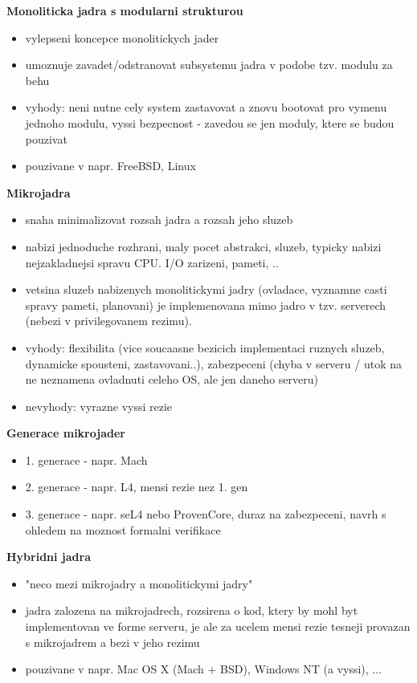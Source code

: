 \documentclass[a4paper, 11pt]{article}
\begin{document}
\noindent\textbf{Monoliticka jadra s modularni strukturou}
\begin{itemize}
    \item vylepseni koncepce monolitickych jader
    \item umoznuje zavadet/odstranovat subsystemu jadra v podobe tzv. modulu za behu
    \item vyhody: neni nutne cely system zastavovat a znovu bootovat pro vymenu jednoho modulu, vyssi bezpecnost - zavedou se jen moduly, ktere se budou pouzivat
    \item pouzivane v napr. FreeBSD, Linux \\
\end{itemize}

\noindent\textbf{Mikrojadra}
\begin{itemize}
    \item snaha minimalizovat rozsah jadra a rozsah jeho sluzeb
    \item nabizi jednoduche rozhrani, maly pocet abstrakci, sluzeb, typicky nabizi nejzakladnejsi spravu CPU. I/O zarizeni, pameti, ..
    \item vetsina sluzeb nabizenych monolitickymi jadry (ovladace, vyznamne casti spravy pameti, planovani) je implemenovana mimo jadro v tzv. serverech (nebezi v privilegovanem rezimu).
    \item vyhody: flexibilita (vice soucaasne bezicich implementaci ruznych sluzeb, dynamicke spousteni, zastavovani..), zabezpeceni (chyba v serveru / utok na ne neznamena ovladnuti celeho OS, ale jen daneho serveru)
    \item nevyhody: vyrazne vyssi rezie \\
\end{itemize}

\noindent\textbf{Generace mikrojader}
\begin{itemize}
    \item 1. generace - napr. Mach
    \item 2. generace - napr. L4, mensi rezie nez 1. gen
    \item 3. generace - napr. seL4 nebo ProvenCore, duraz na zabezpeceni, navrh s ohledem na moznost formalni verifikace \\
\end{itemize}

\newpage

\noindent\textbf{Hybridni jadra}
\begin{itemize}
    \item "neco mezi mikrojadry a monolitickymi jadry"
    \item jadra zalozena na mikrojadrech, rozsirena o kod, ktery by mohl byt implementovan ve forme serveru, je ale za ucelem mensi rezie tesneji provazan s mikrojadrem a bezi v jeho rezimu
    \item pouzivane v napr. Mac OS X (Mach + BSD), Windows NT (a vyssi), ... \\
\end{itemize}
\end{document}
